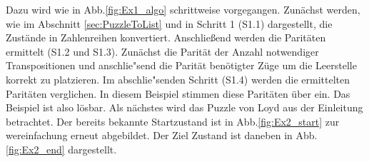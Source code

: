 Dazu wird wie in Abb.\ref{fig:Ex1_algo} schrittweise vorgegangen. Zunächst werden, wie im Abschnitt \ref{sec:PuzzleToList} und in Schritt 1 (S1.1) dargestellt, die Zustände in Zahlenreihen konvertiert.
Anschließend werden die Paritäten ermittelt (S1.2 und S1.3). Zunächst die Parität der Anzahl notwendiger Transpositionen und anschlie"send die Parität benötigter Züge um die Leerstelle korrekt zu platzieren. Im abschlie"senden Schritt (S1.4) werden die ermittelten Paritäten verglichen. In diesem Beispiel stimmen diese Paritäten über ein. Das Beispiel ist also lösbar.%
\WNL%
%
%
Als nächstes wird das Puzzle von Loyd aus der Einleitung betrachtet. Der bereits bekannte Startzustand ist in Abb.\ref{fig:Ex2_start} zur wereinfachung erneut abgebildet. Der Ziel Zustand ist daneben in Abb.\ref{fig:Ex2_end} dargestellt.\\
